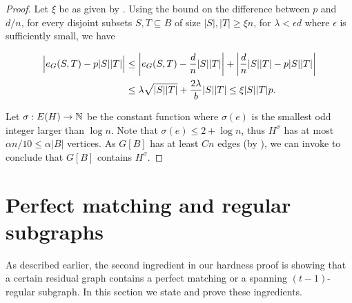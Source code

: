 \documentclass[11pt]{article}
\begin{document}
\begin{proof}
Let $\xi$ be as given by . Using the bound on the difference between $p$ and $d/n$, for every disjoint subsets $S, T \subseteq B$ of size $|S|,|T| \ge \xi n$, for $\lambda < \epsilon d$ where $\epsilon$ is sufficiently small, we have

\begin{align*}
  \Bigl| \CutEdges{S}{T}{G}  - p|S||T| \Bigr| &\le \left| \CutEdges{S}{T}{G} - \frac{d}{n}|S||T| \right| + \left| \frac{d}{n}|S||T| - p|S||T| \right| \\
                                    &\le \lambda \sqrt{|S||T|} + \frac{2 \lambda}{b} |S||T| \le \xi |S||T|p. 
    \end{align*}

    Let $\sigma: E(H) \to \Naturals$ be the constant function where $\sigma(e)$ is the smallest odd integer larger than $\log n$. Note that $\sigma(e) \le 2 + \log n$, thus $H^\sigma$ has at most $\alpha n / 10 \le \alpha |B|$ vertices. As $G[B]$ has at least $Cn$ edges (by ), we can invoke  to conclude that $G[B]$ contains $H^\sigma$.
\end{proof}

\section{Perfect matching and regular subgraphs}
\label{sec:matching-machinery}
As described earlier, the second ingredient in our hardness proof is showing that a certain residual graph contains a perfect matching or a spanning $(t-1)$-regular subgraph. In this section we state and prove these ingredients.
\end{document}
